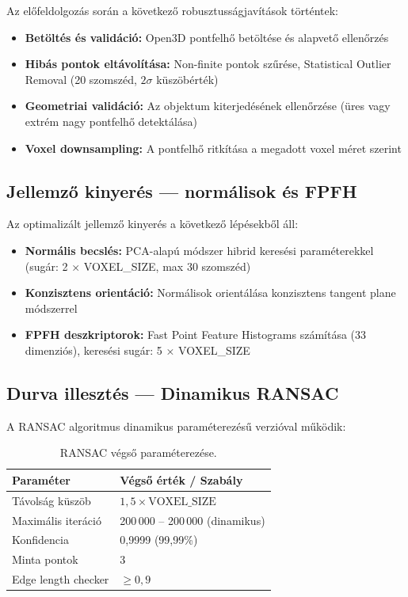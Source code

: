 \documentclass[12pt,a4paper]{article}
\begin{document}
Az előfeldolgozás során a következő robusztusságjavítások történtek:

\begin{itemize}[nosep]
    \item \textbf{Betöltés és validáció:} Open3D pontfelhő betöltése és alapvető ellenőrzés
    \item \textbf{Hibás pontok eltávolítása:} Non-finite pontok szűrése, Statistical Outlier Removal (20 szomszéd, $2\sigma$ küszöbérték)
    \item \textbf{Geometriai validáció:} Az objektum kiterjedésének ellenőrzése (üres vagy extrém nagy pontfelhő detektálása)
    \item \textbf{Voxel downsampling:} A pontfelhő ritkítása a megadott voxel méret szerint
\end{itemize}

\subsection{Jellemző kinyerés — normálisok és FPFH}

Az optimalizált jellemző kinyerés a következő lépésekből áll:

\begin{itemize}[nosep]
    \item \textbf{Normális becslés:} PCA-alapú módszer hibrid keresési paraméterekkel (sugár: 2 × VOXEL\_SIZE, max 30 szomszéd)
    \item \textbf{Konzisztens orientáció:} Normálisok orientálása konzisztens tangent plane módszerrel
    \item \textbf{FPFH deszkriptorok:} Fast Point Feature Histograms számítása (33 dimenziós), keresési sugár: 5 × VOXEL\_SIZE
\end{itemize}

\subsection{Durva illesztés — Dinamikus RANSAC}

A RANSAC algoritmus dinamikus paraméterezésű verzióval működik:

\begin{table}[H]
\centering
\begin{tabular}{ll}
\toprule
\textbf{Paraméter} & \textbf{Végső érték / Szabály} \\
\midrule
Távolság küszöb & $1{,}5 \times \text{VOXEL\_SIZE}$ \\
Maximális iteráció & 200\,000 -- 200\,000 (dinamikus) \\
Konfidencia & 0{,}9999 (99{,}99\%) \\
Minta pontok & 3 \\
Edge length checker & $\geq 0{,}9$ \\
\bottomrule
\end{tabular}
\caption{RANSAC végső paraméterezése.}
\end{table}
\end{document}
